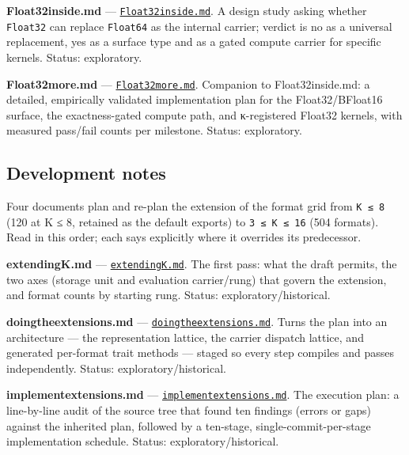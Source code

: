 \textbf{Float32inside.md} — \href{https://github.com/JeffreySarnoff/SmallFloats.jl/blob/main/docs/other/Float32inside.md}{\texttt{Float32inside.md}}. A design study asking whether \texttt{Float32} can replace \texttt{Float64} as the internal carrier; verdict is no as a universal replacement, yes as a surface type and as a gated compute carrier for specific kernels. Status: exploratory.



\textbf{Float32more.md} — \href{https://github.com/JeffreySarnoff/SmallFloats.jl/blob/main/docs/other/Float32more.md}{\texttt{Float32more.md}}. Companion to Float32inside.md: a detailed, empirically validated implementation plan for the Float32/BFloat16 surface, the exactness-gated compute path, and κ-registered Float32 kernels, with measured pass/fail counts per milestone. Status: exploratory.



\subsection{Development notes}



\label{6634534081148595407}{}


Four documents plan and re-plan the extension of the format grid from \texttt{K ≤ 8} (120 at K ≤ 8, retained as the default exports) to \texttt{3 ≤ K ≤ 16} (504 formats). Read in this order; each says explicitly where it overrides its predecessor.



\textbf{extendingK.md} — \href{https://github.com/JeffreySarnoff/SmallFloats.jl/blob/main/docs/other/extendingK.md}{\texttt{extendingK.md}}. The first pass: what the draft permits, the two axes (storage unit and evaluation carrier/rung) that govern the extension, and format counts by starting rung. Status: exploratory/historical.



\textbf{doingtheextensions.md} — \href{https://github.com/JeffreySarnoff/SmallFloats.jl/blob/main/docs/other/doingtheextensions.md}{\texttt{doingtheextensions.md}}. Turns the plan into an architecture — the representation lattice, the carrier dispatch lattice, and generated per-format trait methods — staged so every step compiles and passes independently. Status: exploratory/historical.



\textbf{implementextensions.md} — \href{https://github.com/JeffreySarnoff/SmallFloats.jl/blob/main/docs/other/implementextensions.md}{\texttt{implementextensions.md}}. The execution plan: a line-by-line audit of the source tree that found ten findings (errors or gaps) against the inherited plan, followed by a ten-stage, single-commit-per-stage implementation schedule. Status: exploratory/historical.



